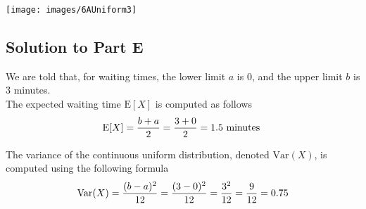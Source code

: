 \documentclass[a4paper,12pt]{article}
\begin{document}

\begin{center}
\texttt{[image: images/6AUniform3]}

\end{center}



\subsection*{Solution to Part E}

We are told that, for waiting times,  the lower limit $a$ is 0, and the upper limit $b$ is 3 minutes. \\ \bigskip The expected waiting time $\textrm{E}[X]$ is computed as follows
\[
\textrm{E}[X] = {b + a \over 2} =  {3 + 0  \over 2}  = 1.5 \mbox{ minutes }
\]


\noindent The variance of the continuous uniform distribution, denoted $\textrm{Var}(X)$,  is  computed using the following formula
\[
\textrm{Var}(X) = {(b - a)^2 \over 12} = {(3 - 0)^2 \over 12} =  {3^2 \over 12} = {9 \over 12} = 0.75
\]
\end{document}
